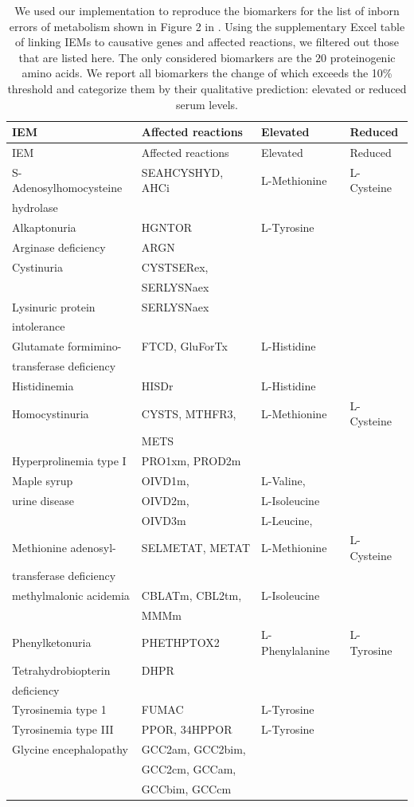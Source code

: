 \documentclass[10pt,a4paper,onecolumn]{article}
\begin{document}
\hypertarget{tbl:amino_acid_iems}{}
\begin{longtable}[]{@{}llll@{}}
\caption{\label{tbl:amino_acid_iems}We used our implementation to
reproduce the biomarkers for the list of inborn errors of metabolism
shown in Figure 2 in \autocite{Shlomi2009}. Using the supplementary
Excel table of \autocite{Shlomi2009} linking IEMs to causative genes and
affected reactions, we filtered out those that are listed here. The only
considered biomarkers are the \(20\) proteinogenic amino acids. We
report all biomarkers the change of which exceeds the 10\% threshold and
categorize them by their qualitative prediction: elevated or reduced
serum levels. }\tabularnewline
\toprule
IEM & Affected reactions & Elevated & Reduced\tabularnewline
\midrule
\endfirsthead
\toprule
IEM & Affected reactions & Elevated & Reduced\tabularnewline
\midrule
\endhead
S-Adenosylhomocysteine & SEAHCYSHYD, AHCi & L-Methionine &
L-Cysteine\tabularnewline
hydrolase & & &\tabularnewline
Alkaptonuria & HGNTOR & L-Tyrosine &\tabularnewline
Arginase deficiency & ARGN & &\tabularnewline
Cystinuria & CYSTSERex, & &\tabularnewline
& SERLYSNaex & &\tabularnewline
Lysinuric protein & SERLYSNaex & &\tabularnewline
intolerance & & &\tabularnewline
Glutamate formimino- & FTCD, GluForTx & L-Histidine &\tabularnewline
transferase deficiency & & &\tabularnewline
Histidinemia & HISDr & L-Histidine &\tabularnewline
Homocystinuria & CYSTS, MTHFR3, & L-Methionine &
L-Cysteine\tabularnewline
& METS & &\tabularnewline
Hyperprolinemia type I & PRO1xm, PROD2m & &\tabularnewline
Maple syrup & OIVD1m, & L-Valine, &\tabularnewline
urine disease & OIVD2m, & L-Isoleucine &\tabularnewline
& OIVD3m & L-Leucine, &\tabularnewline
Methionine adenosyl- & SELMETAT, METAT & L-Methionine &
L-Cysteine\tabularnewline
transferase deficiency & & &\tabularnewline
methylmalonic acidemia & CBLATm, CBL2tm, & L-Isoleucine &\tabularnewline
& MMMm & &\tabularnewline
Phenylketonuria & PHETHPTOX2 & L-Phenylalanine &
L-Tyrosine\tabularnewline
Tetrahydrobiopterin & DHPR & &\tabularnewline
deficiency & & &\tabularnewline
Tyrosinemia type 1 & FUMAC & L-Tyrosine &\tabularnewline
Tyrosinemia type III & PPOR, 34HPPOR & L-Tyrosine &\tabularnewline
Glycine encephalopathy & GCC2am, GCC2bim, & &\tabularnewline
& GCC2cm, GCCam, & &\tabularnewline
& GCCbim, GCCcm & &\tabularnewline
\bottomrule
\end{longtable}

{\sffamily \small
  \printbibliography[title=References]
}
\end{document}
